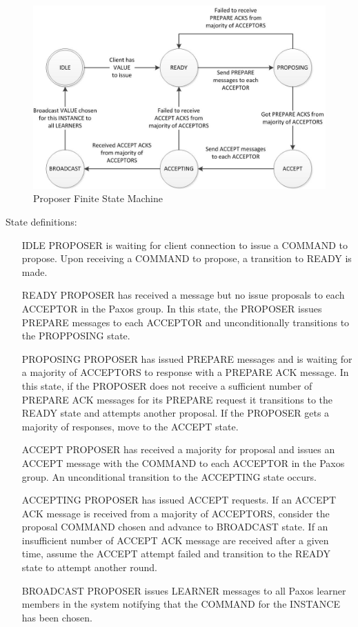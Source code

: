 \documentclass{article}
\begin{document}
\begin{figure}
\centering
\includegraphics[width=6in]{proposer_fsm.jpg}
\caption{Proposer Finite State Machine}
\label{proposer_fsm}
\end{figure}

State definitions:
\begin{itemize}
\item[IDLE] PROPOSER is waiting for client connection to issue a COMMAND to propose. 
  Upon receiving a COMMAND to propose, a transition to READY is made.
\item[READY] PROPOSER has received a message but no issue proposals to each ACCEPTOR in the Paxos group.
  In this state, the PROPOSER issues PREPARE messages to each ACCEPTOR and unconditionally transitions to the PROPPOSING state.
\item[PROPOSING] PROPOSER has issued PREPARE messages and is waiting for a majority of ACCEPTORS to response with a PREPARE ACK message.
  In this state, if the PROPOSER does not receive a sufficient number of PREPARE ACK messages for its PREPARE request it transitions to the READY state and attempts another proposal.
  If the PROPOSER gets a majority of responses, move to the ACCEPT state.
\item[ACCEPT] PROPOSER has received a majority for proposal and issues an ACCEPT message with the COMMAND to each ACCEPTOR in the Paxos group. 
  An unconditional transition to the ACCEPTING state occurs.
\item[ACCEPTING] PROPOSER has issued ACCEPT requests. 
  If an ACCEPT ACK message is received from a majority of ACCEPTORS, consider the proposal COMMAND chosen and advance to BROADCAST state.
 If an insufficient number of ACCEPT ACK message are received after a given time, assume the ACCEPT attempt failed and transition to the READY state to attempt another round. 
\item[BROADCAST] PROPOSER issues LEARNER messages to all Paxos learner members in the system notifying that the COMMAND for the INSTANCE has been chosen.
\end{itemize}
\end{document}
